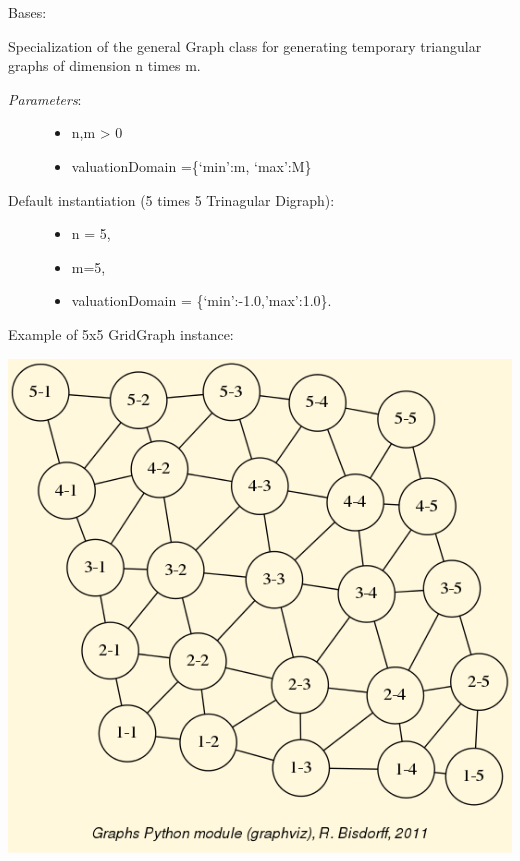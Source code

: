\documentclass[letterpaper,10pt,english]{sphinxmanual}
\begin{document}

\begin{fulllineitems}
\label{techDoc:graphs.TriangularGraph}
Bases: {\hyperref[techDoc:graphs.Graph]{}}

Specialization of the general Graph class for generating
temporary triangular graphs of dimension n times m.
\begin{description}
\item[{\emph{Parameters}:}] \leavevmode\begin{itemize}
\item {} 
n,m \textgreater{} 0

\item {} 
valuationDomain =\{`min':m, `max':M\}

\end{itemize}

\item[{Default instantiation (5 times 5 Trinagular Digraph):}] \leavevmode\begin{itemize}
\item {} 
n = 5,

\item {} 
m=5,

\item {} 
valuationDomain = \{`min':-1.0,'max':1.0\}.

\end{itemize}

\end{description}

Example of 5x5 GridGraph instance:

{\hfill\includegraphics{triangular-5-5.png}\hfill}


\end{fulllineitems}
\end{document}
